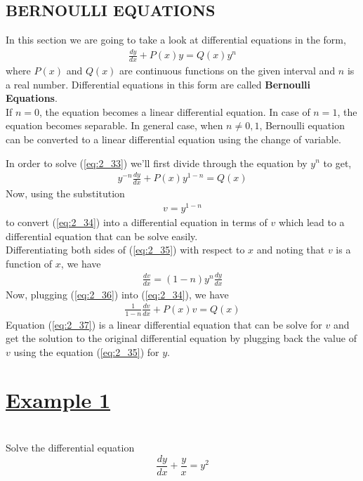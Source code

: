 \documentclass[11pt]{report}
\newcommand{\ubt}[1]{\textbf{\underline{#1}}}
\newcommand{\sps}{\\[0.2cm]}
\newcommand{\spn}[1]{\\[#1cm]}
\newcommand{\refn}[1]{(\ref{#1})}
\newcommand{\refx}[1]{\refn{eq:#1}}
\newcommand{\bt}[1]{\textbf{#1}}
\newcommand{\NI}{\noindent}
\newcommand{\example}[1]{\section*{\ubt{Example #1}}{~}\spn{-1}}
\begin{document}
	
	\subsection{BERNOULLI EQUATIONS}
	In this section we are going to take a look at differential equations in the form,
	\begin{eqnarray}
		\frac{dy}{dx} + P(x)y = Q(x)y^n\label{eq:2_33}
	\end{eqnarray}
	where $P(x)$ and $Q(x)$ are continuous functions on the given interval and $n$ is a real number. Differential equations in this form are called \bt{Bernoulli Equations}.\sps
	If $n=0$, the equation becomes a linear differential equation. In case of $n=1$, the equation becomes separable. In general case, when $n\neq 0,1$, Bernoulli equation can be converted to a linear differential equation using the change of variable.
	
	\NI In order to solve \refx{2_33} we'll first divide through the equation by $y^n$ to get,
	\begin{eqnarray}
		y^{-n}\frac{dy}{dx} + P(x)y^{1-n} = Q(x)\label{eq:2_34}
	\end{eqnarray}  
	Now, using the substitution
	\begin{eqnarray}
		v = y^{1-n}\label{eq:2_35}
	\end{eqnarray}
	to convert \refx{2_34} into a differential equation in terms of $v$ which lead to a differential equation that can be solve easily.\sps
	Differentiating both sides of \refx{2_35} with respect to $x$ and noting that $v$ is a function of $x$, we have
	\begin{eqnarray}
		\frac{dv}{dx} = (1-n)y^{n}\frac{dy}{dx}\label{eq:2_36}
	\end{eqnarray}
	Now, plugging \refx{2_36} into \refx{2_34}, we have
	\begin{eqnarray}
		\frac{1}{1 - n}\frac{dv}{dx} + P(x)v = Q(x)\label{eq:2_37}
	\end{eqnarray}
	Equation \refx{2_37} is a linear differential equation that can be solve for $v$ and get the solution to the original differential equation by plugging back the value of $v$ using the equation \refx{2_35} for $y$.
	
	\example{1}
	Solve the differential equation
	\begin{equation}
		\frac{dy}{dx} + \frac{y}{x} = y^2\tag{1}\label{ex:t_1_1}
	\end{equation}
	
\end{document}
